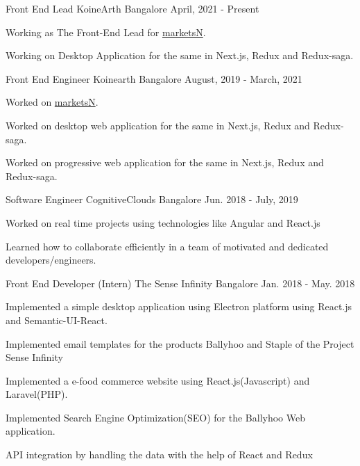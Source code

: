 \begin{cventries}
  \cventry
    {Front End Lead}
    {KoineArth}
    {Bangalore}
    {April, 2021 - Present}
    {
      \begin{cvitems}
        \item{Working as The Front-End Lead for \href{https://marketsn.com/}{marketsN}.}
        \item{Working on Desktop Application for the same in Next.js, Redux and Redux-saga.}
      \end{cvitems}
    }
  \cventry
    {Front End Engineer}
    {Koinearth}
    {Bangalore}
    {August, 2019 - March, 2021}
    {
        \begin{cvitems}
            \item{Worked on \href{https://marketsn.com/}{marketsN}.}
            \item{Worked on desktop web application for the same in Next.js, Redux and Redux-saga.}
            \item{Worked on progressive web application for the same in Next.js, Redux and Redux-saga.}
        \end{cvitems}
  }
  \cventry
    {Software Engineer}
    {CognitiveClouds}
    {Bangalore}
    {Jun. 2018 - July, 2019}
    {
      \begin{cvitems}
        \item{Worked on real time projects using technologies like Angular and React.js}        \item{Learned how to collaborate efficiently in a team of motivated and dedicated developers/engineers.}
      \end{cvitems}
    }
  \cventry
    {Front End Developer (Intern)}
    {The Sense Infinity}
    {Bangalore}
    {Jan. 2018 - May. 2018}
    {
      \begin{cvitems}
        \item{ Implemented a simple desktop application using Electron platform using React.js and Semantic-UI-React.}
        \item {Implemented email templates for the products Ballyhoo and Staple of the Project Sense Infinity}
        \item {Implemented a e-food commerce website using React.js(Javascript) and Laravel(PHP).}
        \item {Implemented Search Engine Optimization(SEO) for the Ballyhoo Web application.}
        \item {API integration by handling the data with the help of React and Redux}

\end{cvitems}}
\end{cventries}
